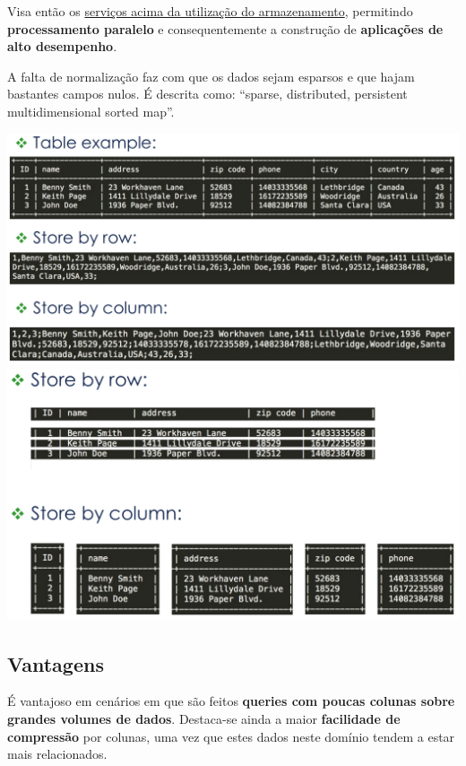 \documentclass{article}
\begin{document}
Visa então os \uline{serviços acima da utilização do armazenamento}, permitindo \textbf{processamento paralelo}
e consequentemente a construção de \textbf{aplicações de alto desempenho}.

A falta de normalização faz com que os dados sejam esparsos e que hajam bastantes campos
nulos. É descrita como: “sparse, distributed, persistent
multidimensional sorted map”.

\begin{center}
  \includegraphics[scale=0.3]{10}
  \includegraphics[scale=0.3]{11}
\end{center}

\pagebreak

\subsection{Vantagens}
É vantajoso em cenários em que são feitos \textbf{queries com poucas colunas sobre
grandes volumes de dados}. Destaca-se ainda a maior \textbf{facilidade de compressão} por colunas,
uma vez que estes dados neste domínio tendem a estar mais relacionados.
\end{document}
